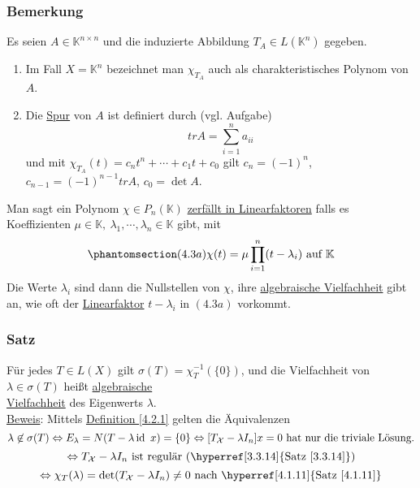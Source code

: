\subsubsection{Bemerkung}
Es seien $A\in\mathbb{K}^{n\times n}$ und die induzierte Abbildung $T_A\in L(\mathbb{K}^n)$ gegeben.
\renewcommand{\labelenumi}{(\arabic{enumi})}
\begin{enumerate}
\item Im Fall $X=\mathbb{K}^n$ bezeichnet man $\chi _{T_A}$ auch als charakteristisches Polynom von $A$.
\item Die \underline{Spur} von $A$ ist definiert durch (vgl. Aufgabe)
\[trA=\sum _{i=1}^n a_{ii}\]
und mit $\chi _{T_A}(t)=c_nt^n+\cdots +c_1t+c_0$ gilt $c_n=(-1)^n$, $c_{n-1}=(-1)^{n-1}trA$, $c_0=\det A$.
\end{enumerate}
Man sagt ein Polynom $\chi \in P_n(\mathbb{K})$ \underline{zerfällt in Linearfaktoren} falls es Koeffizienten $\mu \in \mathbb{K},\ \lambda _1,\cdots ,\lambda _n\in\mathbb{K}$ gibt, mit
\[\phantomsection\label{4.3a}(4.3a)\chi (t) =\mu \prod _{i=1}^n (t-\lambda _i)\text{ auf } \mathbb{K}\]
Die Werte $\lambda _i$ sind dann die Nullstellen von $\chi$, ihre \underline{algebraische Vielfachheit} gibt an, wie oft der \underline{Linearfaktor} $t-\lambda _i$ in \hyperref[4.3a]{$(4.3a)$} vorkommt.
\subsubsection{Satz}
\label{4.3.3}
Für jedes $T\in L(X)$ gilt $\sigma (T)=\chi _T^{-1}(\{0\})$, und die Vielfachheit von $\lambda \in \sigma (T)$ heißt \underline{algebraische}\\ \underline{Vielfachheit} des Eigenwerts $\lambda$.\\
\underline{Beweis}: Mittels \hyperref[4.2.1]{Definition \ref{4.2.1}} gelten die Äquivalenzen
\[\lambda \not\in \sigma (T)\Leftrightarrow E_\lambda = N(T-\lambda \id \ x)=\{0\}\Leftrightarrow[T_\mathcal{X}-\lambda I_n]x=0\text{ hat nur die triviale Lösung.}\]
\[\Leftrightarrow T_\mathcal{X}-\lambda I_n\text{ ist regulär (\hyperref[3.3.14]{Satz \ref{3.3.14}})}\]
\[\Leftrightarrow \chi _T(\lambda)=\det (T_\mathcal{X}-\lambda I_n)\not= 0\text{ nach \hyperref[4.1.11]{Satz \ref{4.1.11}}}\]
